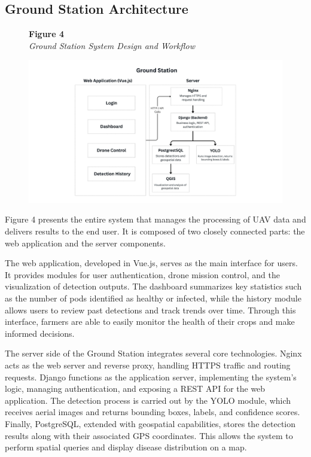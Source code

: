 	\subsection{Ground Station Architecture}
	
	\begin{figure}[H]
		\raggedright
		\textbf{Figure 4} \\ %
		\textit{Ground Station System Design and Workflow} %
		
		\vspace{0.5em}
		\centering
		\includegraphics[width=1\textwidth]{figures/Ground_Station.pdf} %
		
		\vspace{0.5em}
		\raggedright
		
		\label{fig:GroundStation}
	\end{figure}
	
	Figure 4 presents the entire system that manages the processing of UAV data and delivers results to the end user. It is composed of two closely connected parts: the web application and the server components.
	
	The web application, developed in Vue.js, serves as the main interface for users. It provides modules for user authentication, drone mission control, and the visualization of detection outputs. The dashboard summarizes key statistics such as the number of pods identified as healthy or infected, while the history module allows users to review past detections and track trends over time. Through this interface, farmers are able to easily monitor the health of their crops and make informed decisions.
	
	The server side of the Ground Station integrates several core technologies. Nginx acts as the web server and reverse proxy, handling HTTPS traffic and routing requests. Django functions as the application server, implementing the system’s logic, managing authentication, and exposing a REST API for the web application. The detection process is carried out by the YOLO module, which receives aerial images and returns bounding boxes, labels, and confidence scores. Finally, PostgreSQL, extended with geospatial capabilities, stores the detection results along with their associated GPS coordinates. This allows the system to perform spatial queries and display disease distribution on a map.
	
